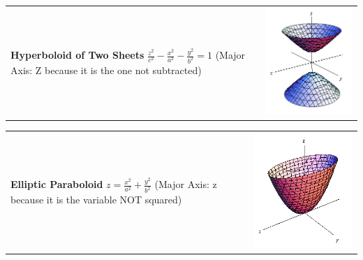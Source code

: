 \documentclass[8pt,landscape]{article}
\begin{document}
\begin{multicols*}{5}
\begin{tabularx}{\linewidth}{@{}X@{}X@{}}
    \textbf{Hyperboloid of Two Sheets}\newline
    $ \frac{z^2}{c^2}-\frac{x^2}{a^2}-\frac{y^2}{b^2} = 1 $\newline
    (Major Axis: Z because it is the one not subtracted)
    & \includegraphics[scale=0.15]{hyperboloid2}
\end{tabularx}

\begin{tabularx}{\linewidth}{@{}X@{}X@{}}
    \textbf{Elliptic Paraboloid}\newline
    $ z=\frac{x^2}{a^2}+\frac{y^2}{b^2} $\newline
    (Major Axis: z because it is the variable NOT squared)
    & \includegraphics[scale=0.15]{elliptic_paraboloid}
\end{tabularx}


\end{multicols*}
\end{document}
